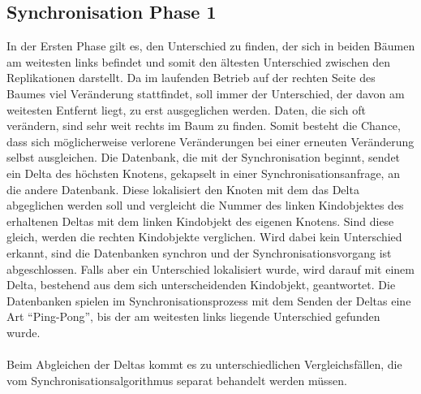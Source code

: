 \documentclass[a4paper,11pt,oneside,%
headsepline,												%
footsepline,												%
bibtotocnumbered									%
]{scrreprt}
\begin{document}
\subsection{Synchronisation Phase 1} 
In der Ersten Phase gilt es, den Unterschied zu finden, der sich in beiden Bäumen am weitesten links befindet und somit den ältesten Unterschied zwischen den Replikationen darstellt. Da im laufenden Betrieb auf der rechten Seite des Baumes viel Veränderung stattfindet, soll immer der Unterschied, der davon am weitesten Entfernt liegt, zu erst ausgeglichen werden. Daten, die sich oft verändern, sind sehr weit rechts im Baum zu finden. Somit besteht die Chance, dass sich möglicherweise verlorene Veränderungen bei einer erneuten Veränderung selbst ausgleichen.
Die Datenbank, die mit der Synchronisation beginnt, sendet ein Delta des höchsten Knotens, gekapselt in einer Synchronisationsanfrage, an die andere Datenbank. Diese lokalisiert den Knoten mit dem das Delta abgeglichen werden soll und vergleicht die Nummer des linken Kindobjektes des erhaltenen Deltas mit dem linken Kindobjekt des eigenen Knotens. Sind diese gleich, werden die rechten Kindobjekte verglichen. Wird dabei kein Unterschied erkannt, sind die Datenbanken synchron und der Synchronisationsvorgang ist abgeschlossen. Falls aber ein Unterschied lokalisiert wurde, wird darauf mit einem Delta, bestehend aus dem sich unterscheidenden Kindobjekt, geantwortet. Die Datenbanken spielen im Synchronisationsprozess mit dem Senden der Deltas eine Art \enquote{Ping-Pong}, bis der am weitesten links liegende Unterschied gefunden wurde.\\\\
Beim Abgleichen der Deltas kommt es zu unterschiedlichen Vergleichsfällen, die vom Synchronisationsalgorithmus separat behandelt werden müssen.
\end{document}
